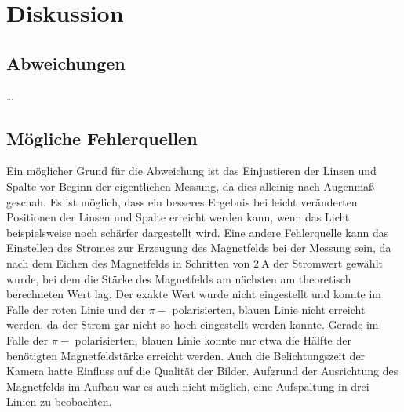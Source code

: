 \section{Diskussion}
\label{sec:diskussion}

\subsection{Abweichungen}

…


\subsection{Mögliche Fehlerquellen}

    Ein möglicher Grund für die Abweichung ist das Einjustieren der Linsen und Spalte vor Beginn der eigentlichen Messung,
    da dies alleinig nach Augenmaß geschah.
    Es ist möglich,
    dass ein besseres Ergebnis bei leicht veränderten Positionen der Linsen und Spalte erreicht werden kann,
    wenn das Licht beispielsweise noch schärfer dargestellt wird.
    Eine andere Fehlerquelle kann das Einstellen des Stromes zur Erzeugung des Magnetfelds bei der Messung sein,
    da nach dem Eichen des Magnetfelds in Schritten von $\SI{2}{\ampere}$ der Stromwert gewählt wurde,
    bei dem die Stärke des Magnetfelds am nächsten am theoretisch berechneten Wert lag.
    Der exakte Wert wurde nicht eingestellt und konnte im Falle der roten Linie und der $\pi-$ polarisierten, 
    blauen Linie nicht erreicht werden,
    da der Strom gar nicht so hoch eingestellt werden konnte.
    Gerade im Falle der $\pi-$ polarisierten, blauen Linie konnte nur etwa die Hälfte der benötigten Magnetfeldstärke erreicht werden.
    Auch die Belichtungszeit der Kamera hatte Einfluss auf die Qualität der Bilder.
    Aufgrund der Ausrichtung des Magnetfelds im Aufbau war es auch nicht möglich,
    eine Aufspaltung in drei Linien zu beobachten.

